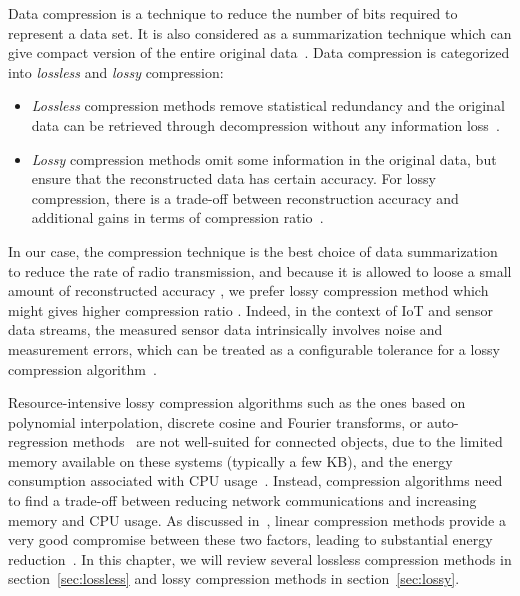 Data compression is a technique to reduce the number of bits required to
represent a data set. It is also considered as a summarization technique
which can give compact version of the entire original
data~\cite{hesabi2015data}. Data compression is categorized into
\emph{lossless} and \emph{lossy} compression:
\begin{itemize}
    \item \emph{Lossless} compression methods remove statistical redundancy and
    the original data can be retrieved through decompression without any
    information loss~\cite{hesabi2015data}.
    \item \emph{Lossy} compression methods omit some information in the
    original data, but ensure that the reconstructed data has certain accuracy. For
    lossy compression, there is a trade-off between reconstruction accuracy and
    additional gains in terms of compression ratio~\cite{zordan2014performance}.
\end{itemize}

In our case, the compression technique is the best choice of data summarization
to reduce the rate of radio transmission, and because it is allowed to loose a
small amount of reconstructed accuracy ,
 we prefer lossy compression method which
might gives higher compression ratio . 
Indeed, in the context of IoT and sensor data streams, the
measured sensor data intrinsically involves noise and measurement errors, which
can be treated as a configurable tolerance for a lossy compression
algorithm~\cite{li2018multi}.

Resource-intensive lossy compression algorithms such as the ones based on
polynomial interpolation, discrete cosine and Fourier transforms, or
auto-regression methods~\cite{lu2010optimized} are not well-suited for
connected objects, due to the limited memory available on these systems
(typically a few KB), and the energy consumption associated with CPU
usage~\cite{li2018multi}. Instead, compression algorithms need to find a
trade-off between reducing network communications and increasing memory and CPU
usage. As discussed in~\cite{zordan2014performance}, linear compression methods
provide a very good compromise between these two factors, leading to
substantial energy reduction~\cite{li2018multi}. In this chapter, we will
review several lossless compression methods in section~\ref{sec:lossless} and
lossy compression methods in section~\ref{sec:lossy}.
